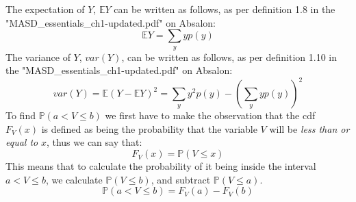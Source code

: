 The expectation of $Y$, $\mathbb{E}Y$ can be written as follows, as per definition 1.8 in the "MASD\_essentials\_ch1-updated.pdf" on Absalon:
$$
\mathbb{E}Y = \sum_y y p(y)
$$
The variance of $Y$, $var(Y)$, can be written as follows, as per definition 1.10 in the "MASD\_essentials\_ch1-updated.pdf" on Absalon:
$$
var(Y) = \mathbb{E}(Y-\mathbb{E}Y)^2 = \sum_y y^2p(y) - (\sum_y y p(y))^2
$$
To find $\mathbb{P}(a<V\leq b)$ we first have to make the observation that the cdf $F_V(x)$ is defined as being the probability that the variable $V$ will be \textit{less than or equal to} $x$, thus we can say that:
$$
F_V(x) = \mathbb{P}(V \leq x)
$$
This means that to calculate the probability of it being inside the interval ${a<V\leq b}$, we calculate $\mathbb{P}(V\leq b)$, and subtract $\mathbb{P}(V \leq a)$.
$$
\mathbb{P}(a<V\leq b) = F_V(a)-F_V(b)
$$